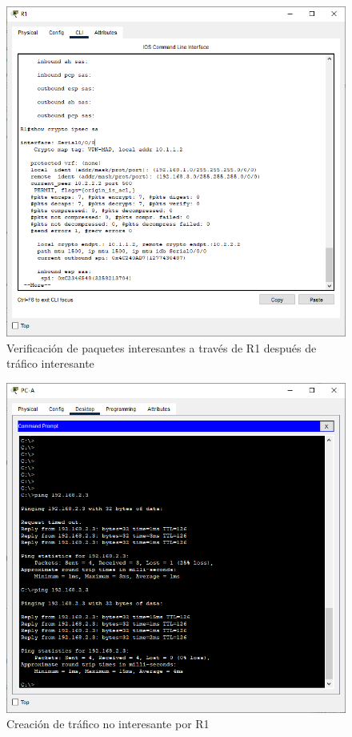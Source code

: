 \documentclass{article}
\begin{document}
        \begin{figure}[!h]
            \centering
            \includegraphics[scale=0.45]{img/task3-step3.png}
            \caption{Verificación de paquetes interesantes a través de R1 después de tráfico interesante}
            \label{fig:task3-step3}
        \end{figure}

        \clearpage
        \begin{figure}[!h]
            \centering
            \includegraphics[scale=0.45]{img/task3-step4.png}
            \caption{Creación de tráfico no interesante por R1}
            \label{fig:task3-step4}
        \end{figure}
\end{document}
